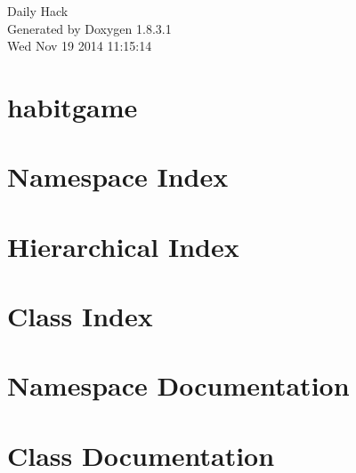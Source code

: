 \documentclass{book}
\begin{document}
\hypersetup{pageanchor=false,citecolor=blue}
\begin{titlepage}
\vspace*{7cm}
\begin{center}
{\Large Daily Hack }\\
\vspace*{1cm}
{\large Generated by Doxygen 1.8.3.1}\\
\vspace*{0.5cm}
{\small Wed Nov 19 2014 11:15:14}\\
\end{center}
\end{titlepage}
\clearemptydoublepage
{}
\tableofcontents
\clearemptydoublepage
{}
\hypersetup{pageanchor=true,citecolor=blue}
\chapter{habitgame}
\label{md_README}
\hypertarget{md_README}{}

\chapter{Namespace Index}

\chapter{Hierarchical Index}

\chapter{Class Index}

\chapter{Namespace Documentation}



\chapter{Class Documentation}



























\printindex
\end{document}
